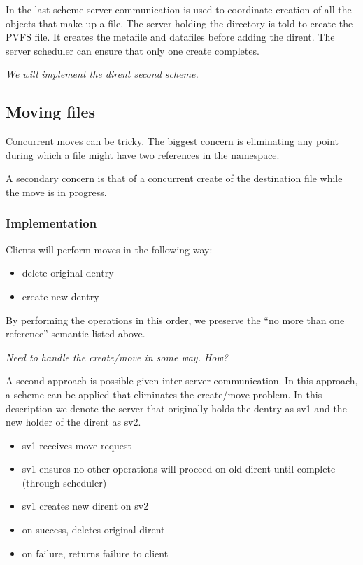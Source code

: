 \documentclass[10pt]{article} %
\begin{document}
In the last scheme server communication is used to coordinate creation of all
the objects that make up a file.  The server holding the directory is told to
create the PVFS file.  It creates the metafile and datafiles before adding the
dirent.  The server scheduler can ensure that only one create completes.

\emph{We will implement the dirent second scheme.}

\subsection{Moving files}

Concurrent moves can be tricky.  The biggest concern is eliminating any point
during which a file might have two references in the namespace.

A secondary concern is that of a concurrent create of the destination file
while the move is in progress.

\subsubsection{Implementation}

Clients will perform moves in the following way:
\begin{itemize}
\item delete original dentry
\item create new dentry
\end{itemize}
By performing the operations in this order, we preserve the ``no more than one
reference'' semantic listed above.

\emph{Need to handle the create/move in some way.  How?}

A second approach is possible given inter-server communication.  In this
approach, a scheme can be applied that eliminates the create/move problem.  In
this description we denote the server that originally holds the dentry as sv1
and the new holder of the dirent as sv2.
\begin{itemize}
\item sv1 receives move request
\item sv1 ensures no other operations will proceed on old dirent until
      complete (through scheduler)
\item sv1 creates new dirent on sv2
\item on success, deletes original dirent
\item on failure, returns failure to client
\end{itemize}
\end{document}

